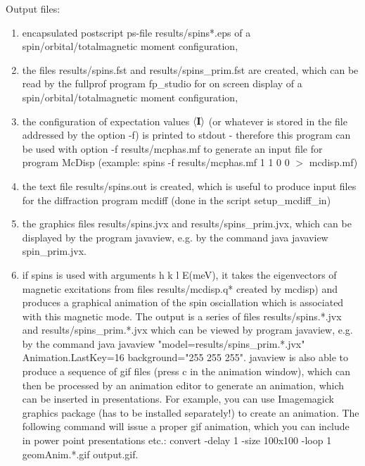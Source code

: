 Output files:
\begin{enumerate}
  \item encapsulated postscript ps-file {\prg results/spins*.eps}
                  of a spin/orbital/totalmagnetic moment configuration, 
  \item the files {\prg results/spins.fst} and {\prg results/spins\_prim.fst} are created, 
                which can be read by the fullprof program {\prg fp\_studio}
                for on screen display of a spin/orbital/totalmagnetic moment configuration,
  \item the configuration of expectation values $\langle\mathbf I\rangle$ (or whatever is stored in the file addressed by the option -f)
                 is printed to stdout - therefore this program can be used with option {\prg -f results/mcphas.mf} 
			       to generate an input file
			       for program {\prg  McDisp} (example: {\prg spins -f results/mcphas.mf 1 1 0 0  $>$ mcdisp.mf})  
  \item the text file {\prg results/spins.out} is created, which is useful to produce input files for
              the diffraction program {\prg mcdiff} (done in the script {\prg setup\_mcdiff\_in})
  \item the graphics files {\prg results/spins.jvx} and {\prg results/spins\_prim.jvx}, which can be displayed
         by the program {\prg javaview}, e.g. by the command {\prg java javaview spin\_prim.jvx}.
  \item if {\prg spins} is used with arguments {\prg h k l E(meV)}, it takes the eigenvectors of magnetic 
excitations
        from files {\prg results/mcdisp.q*}  created by {\prg mcdisp}) and produces a graphical
        animation of the spin osciallation which is associated with this magnetic mode. The output is a series
        of files {\prg results/spins.*.jvx} and {\prg results/spins\_prim.*.jvx} which can be viewed by program
        {\prg javaview}, e.g. by the command {\prg java javaview "model=results/spins\_prim.*.jvx" 
        Animation.LastKey=16 background="255 255 255"}.  {\prg javaview} is also able to produce a sequence
		of gif files (press c in the animation window), which can then be processed by an animation editor
		to generate an animation, which can be inserted in presentations. For example, you can use
 {\prg  Imagemagick} graphics package (has to be installed separately!)
        to create an animation. The following command will issue a proper gif animation, which you can include in 
           power point        
        presentations etc.: {\prg convert -delay 1 -size 100x100 -loop 1 geomAnim.*.gif output.gif}.
 \end{enumerate}

